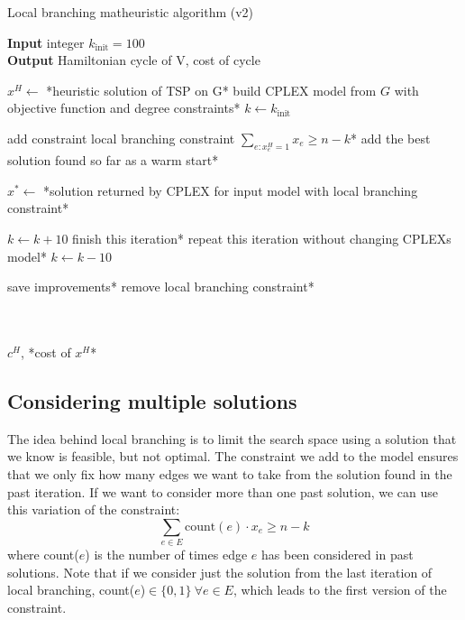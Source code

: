 \begin{algorithm}[h]
    \caption{Local branching matheuristic algorithm (v2)}
    \textbf{Input} integer $k_{\text{init}} = 100$\\
    \textbf{Output} Hamiltonian cycle of V, cost of cycle\\
    \begin{algorithmic}

        \State $x^H \gets$ *heuristic solution of TSP on G*
        \State *build CPLEX model from $G$ with objective function and degree constraints*
        \State $k\gets k_{\text{init}}$


                \State *add constraint local branching constraint $\sum_{e:x_e^H=1}x_e\geq n-k$*
                \State *add the best solution found so far as a warm start*
            \EndIf

            \State $x^*\gets$ *solution returned by CPLEX for input model with local branching constraint*


                    \State $k\gets k+10$
                    \State *finish this iteration*
                \Else
                    \State *repeat this iteration without changing CPLEXs model*
                \EndIf
            \Else
                    \State $k\gets k-10$
                \EndIf
            \EndIf

            \State *save improvements*
            \State *remove local branching constraint*

        \EndWhile\\\\

        \Return $c^H$, *cost of $x^H$*

    \end{algorithmic}
\end{algorithm}

\newpage

\subsection{Considering multiple solutions}

The idea behind local branching is to limit the search space using a solution that we know is feasible, but not optimal. The constraint we add to the model ensures that we only fix how many edges we want to take from the solution found in the past iteration. If we want to consider more than one past solution, we can use this variation of the constraint:
$$\sum_{e\in E}\mbox{count}(e)\cdot x_e\geq n-k$$
where count($e$) is the number of times edge $e$ has been considered in past solutions. Note that if we consider just the solution from the last iteration of local branching, count($e$)$\in\{0,1\} \ \forall e\in E$, which leads to the first version of the constraint.

